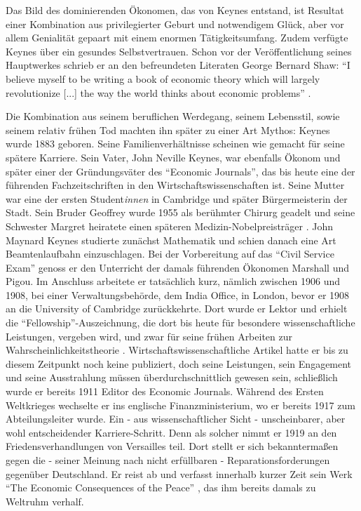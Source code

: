 Das Bild des dominierenden Ökonomen, das von Keynes entstand, ist Resultat einer Kombination aus privilegierter Geburt und notwendigem Glück, aber vor allem Genialität gepaart mit einem enormen Tätigkeitsumfang. Zudem verfügte Keynes über ein gesundes Selbstvertrauen. Schon vor der Veröffentlichung seines Hauptwerkes schrieb er an den befreundeten Literaten George Bernard Shaw: "`I believe myself to be writing a book of economic theory which will largely revolutionize [...] the way the world thinks about economic problems"' \parencite[S.13]{Warsh}. 

Die Kombination aus seinem beruflichen Werdegang, seinem Lebensstil, sowie seinem relativ frühen Tod machten ihn später zu einer Art Mythos: Keynes wurde 1883 geboren. Seine Familienverhältnisse scheinen wie gemacht für seine spätere Karriere. Sein Vater, John Neville Keynes, war ebenfalls Ökonom und später einer der Gründungsväter des "`Economic Journals"', das bis heute eine der führenden Fachzeitschriften in den Wirtschaftswissenschaften ist. Seine Mutter war eine der ersten Student\textit{innen} in Cambridge und später Bürgermeisterin der Stadt. Sein Bruder Geoffrey wurde 1955 als berühmter Chirurg geadelt und seine Schwester Margret heiratete einen späteren Medizin-Nobelpreisträger \parencite[S. 275]{Scherf1989}. John Maynard Keynes studierte zunächst Mathematik und schien danach eine Art Beamtenlaufbahn einzuschlagen. Bei der Vorbereitung auf das "`Civil Service Exam"' genoss er den Unterricht der damals führenden Ökonomen Marshall und Pigou. Im Anschluss arbeitete er tatsächlich kurz, nämlich zwischen 1906 und 1908, bei einer Verwaltungsbehörde, dem India Office, in London, bevor er 1908 an die University of Cambridge zurückkehrte. Dort wurde er Lektor und erhielt die "`Fellowship"'-Auszeichnung, die dort bis heute für besondere wissenschaftliche Leistungen, vergeben wird, und zwar für seine frühen Arbeiten zur Wahrscheinlichkeitstheorie \parencite[S. 276]{Scherf1989}. Wirtschaftswissenschaftliche Artikel hatte er bis zu diesem Zeitpunkt noch keine publiziert, doch seine Leistungen, sein Engagement und seine Ausstrahlung müssen überdurchschnittlich gewesen sein, schließlich wurde er bereits 1911 Editor des Economic Journals. Während des Ersten Weltkrieges wechselte er ins englische Finanzministerium, wo er bereits 1917 zum Abteilungsleiter wurde. Ein - aus wissenschaftlicher Sicht - unscheinbarer, aber wohl entscheidender Karriere-Schritt. Denn als solcher nimmt er 1919 an den Friedensverhandlungen von Versailles teil. Dort stellt er sich bekanntermaßen gegen die - seiner Meinung nach nicht erfüllbaren - Reparationsforderungen gegenüber Deutschland. Er reist ab und verfasst innerhalb kurzer Zeit sein Werk "`The Economic Consequences of the Peace"' \parencite{Keynes1919}, das ihm bereits damals zu Weltruhm verhalf. 

